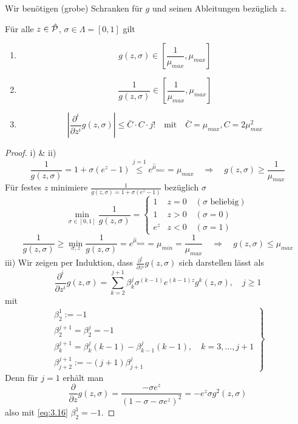 Wir benötigen (grobe) Schranken für $g$ und seinen Ableitungen bezüglich $z$.

\begin{lemma}
	Für alle $z \in \hat{\mathcal{P}}$, $\sigma \in \Lambda = [0,1]$ gilt
	\begin{enumerate}
		\item
			\[
				g(z,\sigma) \in \left[ \frac{1}{\mu_{max}}, \mu_{max} \right]
			\]
		\item
			\[
				\frac{1}{g(z,\sigma)} \in \left[ \frac{1}{\mu_{max}}, \mu_{max} \right]
			\]
		\item
			\[
				\left| \frac{\partial^i}{\partial z^i} g(z,\sigma) \right| \leq \bar C \cdot C \cdot j! \quad \text{mit} \quad \bar C = \mu_{max}, C = 2\mu_{max}^2
			\]
	\end{enumerate}

	\begin{proof}
		i) \& ii)
		\[
			\frac{1}{g(z,\sigma)} = 1 + \sigma (e^z-1) \stackrel{j=1}{\leq} e^{\hat\mu_{max}} = \mu_{max} \quad \Rightarrow \quad g(z,\sigma) \geq \frac{1}{\mu_{max}}
		\]
		Für festes $z$ minimiere $\frac{1}{g(z,\sigma) = 1+\sigma(e^z-1)}$ bezüglich $\sigma$
		\[
			\min_{\sigma \in [0,1]} \frac{1}{g(z,\sigma)} = \begin{cases}
				1 & z = 0 \quad (\sigma \text{ beliebig})\\
				1 & z > 0 \quad (\sigma = 0)\\
				e^z & z < 0 \quad (\sigma = 1)
			\end{cases}
		\]
		\[
			\frac{1}{g(z,\sigma)} \geq \min_{\sigma,z} \frac{1}{g(z,\sigma)} = e^{\hat\mu_{min}} = \mu_{min} = \frac{1}{\mu_{max}} \quad \Rightarrow \quad g(z,\sigma) \leq \mu_{max}
		\]
		iii) Wir zeigen per Induktion, dass $\frac{\partial^i}{\partial z^i} g(z,\sigma)$ sich darstellen lässt als
		\begin{equation}
			\frac{\partial^i}{\partial z^i} g(z,\sigma) = \sum_{k=2}^{j+1} \beta_k^j \sigma^{(k-1)} e^{(k-1)z} g^k(z,\sigma), \quad j \geq 1 \label{eq:3.16}
		\end{equation}
		mit
		\begin{equation}
			\left.
			\begin{array}{l}
				\beta_2^1 := -1\\
				\beta_2^{j+1} = \beta_2^j = -1\\
				\beta_k^{j+1} = \beta_k^j (k-1) - \beta_{k-1}^j(k-1), \quad k = 3,\dots,j+1\\
				\beta_{j+2}^{j+1} := -(j+1) \beta_{j+1}^j
			\end{array}
			\right\} \label{eq:3.17}
		\end{equation}
		Denn für $j = 1$ erhält man
		\[
			\frac{\partial}{\partial z} g(z,\sigma) = \frac{-\sigma e^z}{(1-\sigma-\sigma e^z)^2} = -e^z \sigma g^2(z,\sigma)
		\]
		also mit \eqref{eq:3.16} $\beta_2^1 = -1$.

\end{proof}
\end{lemma}
